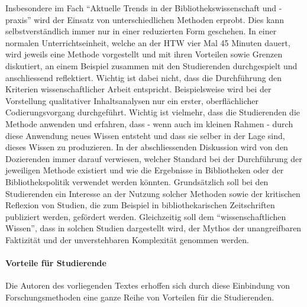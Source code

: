 \documentclass[a4paper,
fontsize=11pt,
oneside,
numbers=noperiodatend,
parskip=half-,
bibliography=totoc,
final
]{scrartcl}
\begin{document}
Insbesondere im Fach \enquote{Aktuelle Trends in der
Bibliothekswissenschaft und -praxis} wird der Einsatz von
unterschiedlichen Methoden erprobt. Dies kann selbstverständlich immer
nur in einer reduzierten Form geschehen. In einer normalen
Unterrichtseinheit, welche an der HTW vier Mal 45 Minuten dauert, wird
jeweils eine Methode vorgestellt und mit ihren Vorteilen sowie Grenzen
diskutiert, an einem Beispiel zusammen mit den Studierenden
durchgespielt und anschliessend reflektiert. Wichtig ist dabei nicht,
dass die Durchführung den Kriterien wissenschaftlicher Arbeit
entspricht. Beispielsweise wird bei der Vorstellung qualitativer
Inhaltsanalysen nur ein erster, oberflächlicher Codierungsvorgang
durchgeführt. Wichtig ist vielmehr, dass die Studierenden die Methode
anwenden und erfahren, dass - wenn auch im kleinen Rahmen - durch diese
Anwendung neues Wissen entsteht und dass sie selber in der Lage sind,
dieses Wissen zu produzieren. In der abschliessenden Diskussion wird von
den Dozierenden immer darauf verwiesen, welcher Standard bei der
Durchführung der jeweiligen Methode existiert und wie die Ergebnisse in
Bibliotheken oder der Bibliothekspolitik verwendet werden könnten.
Grundsätzlich soll bei den Studierenden ein Interesse an der Nutzung
solcher Methoden sowie der kritischen Reflexion von Studien, die zum
Beispiel in bibliothekarischen Zeitschriften publiziert werden,
gefördert werden. Gleichzeitig soll dem \enquote{wissenschaftlichen
Wissen}, dass in solchen Studien dargestellt wird, der Mythos der
unangreifbaren Faktizität und der unverstehbaren Komplexität genommen
werden.

\paragraph{Vorteile für Studierende}\label{vorteile-fuxfcr-studierende}

Die Autoren des vorliegenden Textes erhoffen sich durch diese Einbindung
von Forschungsmethoden eine ganze Reihe von Vorteilen für die
Studierenden.
\end{document}
